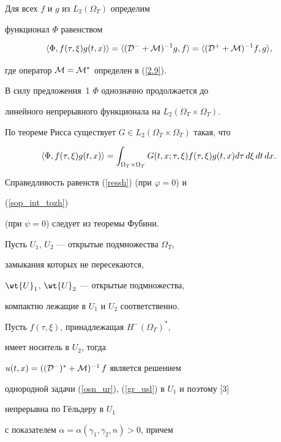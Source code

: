 \begin{pf}


Для всех $f$ и $g$ из $L_2(\Omega_T)$ определим


функционал $\Phi$ равенством


$$


\la{\Phi}, f(\tau,\xi)g(t,x) \ra=\la({\cal D}^- + {\cal M})^{-1}g,f\ra=


\la({\cal D}^+ +{\cal M})^{-1}f,g\ra,


$$


где оператор ${\cal M}={\cal M}^*$ определен в (\ref{2.9}).


В силу предложения~1\; ${\Phi}$ однозначно продолжается до


линейного непрерывного функционала на $L_2(\Omega_T\times\Omega_T)$.





По теореме Рисса существует $G\in L_2(\Omega_T\times \Omega_T)$ такая, что


$$


\la{ \Phi},f(\tau,\xi)g(t,x)\ra=


\int_{\Omega_T\times\Omega_T}


G(t,x;\tau,\xi)f(\tau,\xi)g(t,x)d\tau\, d\xi\, dt\, dx.


$$ 


Справедливость равенств (\ref{ressh}) (при $\varphi=0$) и


(\ref{sop_int_tozh})


(при $\psi=0$) следует из теоремы Фубини.





Пусть $U_1$, $U_2$ --- открытые подмножества $\Omega_T$, 


замыкания которых не пересекаются,


$\wt{U}_1$, $\wt{U}_2$ --- открытые подмножества,


компактно лежащие в $U_1$ и $U_2$ соответственно. 


Пусть $f(\tau,\xi)$, принадлежащая $H^-(\Omega_T)^*$,


имеет носитель в $U_2$, тогда 


$u(t,x)=(({\cal D}^-)^* +{\cal M})^{-1} \,f$ является решением


однородной задачи (\ref{osn_ur}), (\ref{gr_usl}) в $U_1$ и поэтому [3]


непрерывна по Г\"ельдеру в $U_1$


с показателем $\alpha=\alpha(\gamma_1,\gamma_2,n)>0$, причем



\end{pf}
